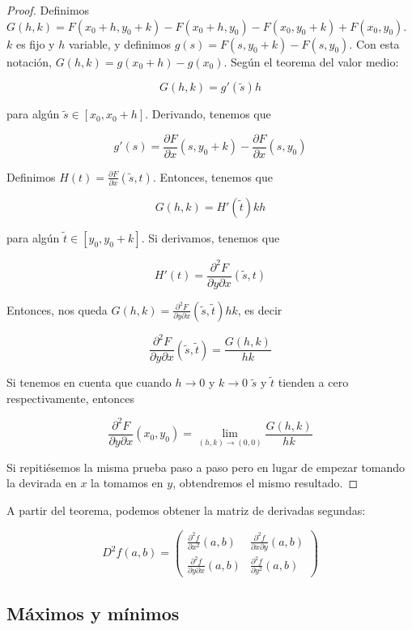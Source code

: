 \documentclass[nochap]{apuntes}
\begin{document}
\begin{proof}
Definimos $G(h,k) = F(x_0+h, y_0+k) - F(x_0+h, y_0) - F(x_0, y_0 +k) + F(x_0, y_0)$. $k$ es fijo y $h$ variable, y definimos $g(s) = F(s, y_0 + k) - F(s, y_0)$. Con esta notación, $G(h,k) = g(x_0+h) - g(x_0)$. Según el teorema del valor medio:

\[ G(h,k) = g'(\tilde{s})h \]

para algún $\tilde{s} \in [x_0, x_0+h]$. Derivando, tenemos que

\[ g'(s) = \frac{∂F}{∂x}(s, y_0+k) - \frac{∂F}{∂x} (s, y_0) \]

Definimos $H(t) = \frac{∂F}{∂x} (\tilde{s}, t)$. Entonces, tenemos que 

\[G(h,k) = H'(\tilde{t})kh \]

para algún  $\tilde{t} \in [y_0, y_0+k]$. Si derivamos, tenemos que 

\[ H'(t) = \frac{∂^2 F}{∂y∂x}(\tilde{s}, t) \]

Entonces, nos queda $G(h,k) = \frac{∂^2F}{∂y∂x}(\tilde{s}, \tilde{t}) h k$, es decir

\[\frac{∂^2F}{∂y∂x}(\tilde{s}, \tilde{t}) = \frac{G(h,k)}{hk} \]

Si tenemos en cuenta que cuando $h\to 0$ y $k\to 0$ $\tilde{s}$ y $\tilde{t}$ tienden a cero respectivamente, entonces

\[ \frac{∂^2F}{∂y∂x}(x_0, y_0) = \lim_{(h,k) \to (0,0)} \frac{G(h,k)}{hk} \] 

Si repitiésemos la misma prueba paso a paso pero en lugar de empezar tomando la devirada en $x$ la tomamos en $y$, obtendremos el mismo resultado.
\end{proof}

A partir del teorema, podemos obtener la matriz de derivadas segundas:

\begin{defn}
\[D^2f(a,b) = \left(\begin{matrix} \frac{\partial^2 f}{∂ x^2} (a,b) & \frac{\partial^2 f}{\partial x \partial y} (a,b) 
\\ \frac{\partial^2 f}{\partial y \partial x} (a,b) & \frac{\partial^2 f}{\partial y^2} (a,b) \end{matrix}\right) \]
\end{defn}

\subsection{Máximos y mínimos}
\end{document}
